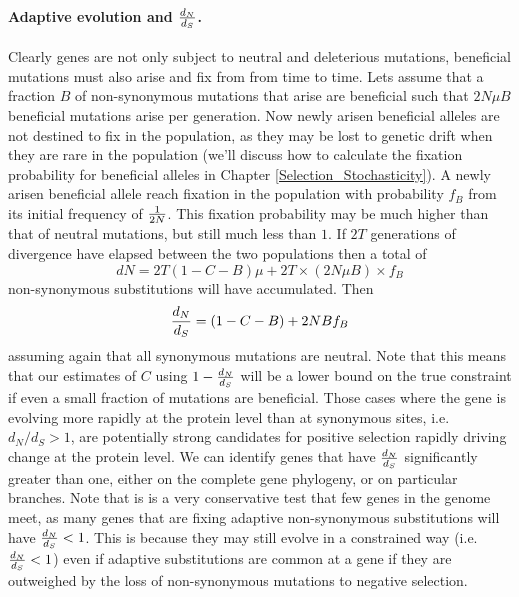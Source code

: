 \paragraph{Adaptive evolution and $\dNdS$.}
Clearly genes are not only subject to neutral and deleterious mutations, beneficial mutations must also arise and fix from from time to time. 
Lets assume that a fraction $B$ of non-synonymous mutations that arise are
beneficial such that $2 N \mu B$ beneficial mutations arise per generation. Now newly arisen beneficial alleles are not destined to fix in the population, as they may be lost to genetic drift when they are rare in the population (we'll
discuss how to calculate the fixation probability for beneficial
alleles in Chapter \ref{Selection_Stochasticity}). A newly arisen beneficial allele reach fixation in the population with probability $f_B$ from its initial frequency of $\nicefrac{1}{2N}$. This fixation
probability may be much higher than that of neutral mutations, but still much less than $1$.  If $2T$ generations of divergence have
elapsed between the two populations then a total of
\begin{equation}
dN=2T (1-C - B) \mu  + 2T \times (2 N \mu B) \times  f_B
\end{equation}
non-synonymous substitutions will have accumulated.
Then
\begin{equation} 
\dNdS = (1-C-B) +  2 N B f_B
\end{equation}
assuming again that all synonymous mutations are neutral. Note that this means that our estimates of $C$ using $1-\dNdS$ will be
a  lower bound on the true constraint if even a small fraction of
mutations are beneficial. Those cases where the gene is evolving more rapidly at the protein level than at synonymous
sites, i.e. $d_N/d_S > 1$, are potentially strong candidates for  positive selection rapidly driving change at the protein level. We can identify genes that have $\dNdS$ significantly greater than one, either on the complete gene phylogeny, or on particular branches. Note that is is a very conservative test that few genes in the genome meet, as many genes that are fixing adaptive non-synonymous substitutions will have $\dNdS<1$. This is because they may still evolve in a constrained way (i.e. $\dNdS<1$)  even if adaptive substitutions are common at a gene if
they are outweighed by the loss of non-synonymous mutations to negative selection.


